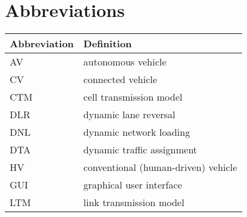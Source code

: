 \chapter{Abbreviations}

\begin{longtable}{ll}
\hline
Abbreviation & Definition\\\hline
\endhead
AV & autonomous vehicle\\
CV & connected vehicle \\
CTM &  cell transmission model~\cite{daganzo1994cell, daganzo1995cell}\\
DLR & dynamic lane reversal~\cite{levin2016cell, duell2016system} \\
DNL & dynamic network loading~\cite{chiu2011dynamic} \\
DTA & dynamic traffic assignment~\cite{chiu2011dynamic} \\
HV & conventional (human-driven) vehicle\\
GUI & graphical user interface\\
LTM & link transmission model~\cite{yperman2005link, yperman2007link}\\
\hline
\end{longtable}